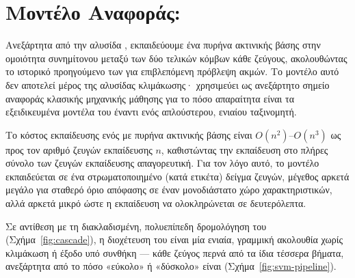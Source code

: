 \section{Μοντέλο Αναφοράς: }
\label{sec:svm-baseline}

Ανεξάρτητα από την αλυσίδα , εκπαιδεύουμε ένα  πυρήνα
ακτινικής βάσης στην ομοιότητα συνημίτονου  μεταξύ των δύο τελικών
κόμβων κάθε ζεύγους, ακολουθώντας το ιστορικό προηγούμενο των
\textcite{alhasan2006link} για επιβλεπόμενη πρόβλεψη ακμών.
Το μοντέλο αυτό δεν
αποτελεί μέρος της αλυσίδας κλιμάκωσης· χρησιμεύει ως ανεξάρτητο σημείο αναφοράς
κλασικής μηχανικής μάθησης για το πόσο απαραίτητα είναι τα εξειδικευμένα μοντέλα
του  έναντι ενός απλούστερου, ενιαίου ταξινομητή.

Το κόστος εκπαίδευσης ενός  με πυρήνα ακτινικής βάσης είναι
$O(n^2)$--$O(n^3)$ ως προς τον αριθμό ζευγών εκπαίδευσης $n$, καθιστώντας την
εκπαίδευση στο πλήρες σύνολο των \TrainPairs{} ζευγών εκπαίδευσης απαγορευτική.
Για
τον λόγο αυτό, το μοντέλο εκπαιδεύεται σε ένα στρωματοποιημένο (κατά ετικέτα)
δείγμα \SvmSampleSize{} ζευγών, μέγεθος αρκετά μεγάλο για σταθερό όριο απόφασης σε έναν
μονοδιάστατο χώρο χαρακτηριστικών, αλλά αρκετά μικρό ώστε η εκπαίδευση να
ολοκληρώνεται σε δευτερόλεπτα.

Σε αντίθεση με τη διακλαδισμένη, πολυεπίπεδη δρομολόγηση του 
(Σχήμα~\ref{fig:cascade}), η διοχέτευση του  είναι μία ενιαία, γραμμική
ακολουθία χωρίς κλιμάκωση ή έξοδο υπό συνθήκη --- κάθε ζεύγος περνά από τα ίδια
τέσσερα βήματα, ανεξάρτητα από το πόσο «εύκολο» ή «δύσκολο» είναι
(Σχήμα~\ref{fig:svm-pipeline}).

